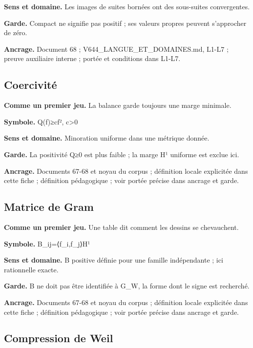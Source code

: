 \documentclass[
  9pt,
  a4paper,
]{article}
\begin{document}
\textbf{Sens et domaine.} Les images de suites bornées ont des
sous-suites convergentes.

\textbf{Garde.} Compact ne signifie pas positif ; ses valeurs propres
peuvent s'approcher de zéro.

\textbf{Ancrage.} Document 68 ; V644\_LANGUE\_ET\_DOMAINES.md, L1-L7 ;
preuve auxiliaire interne ; portée et conditions dans L1-L7.

\hypertarget{coercivituxe9}{%
\subsection{Coercivité}\label{coercivituxe9}}

\textbf{Comme un premier jeu.} La balance garde toujours une marge
minimale.

\textbf{Symbole.} Q(f)≥c\textbar\textbar f\textbar\textbar²,
c\textgreater0

\textbf{Sens et domaine.} Minoration uniforme dans une métrique donnée.

\textbf{Garde.} La positivité Q≥0 est plus faible ; la marge H¹ uniforme
est exclue ici.

\textbf{Ancrage.} Documents 67-68 et noyau du corpus ; définition locale
explicitée dans cette fiche ; définition pédagogique ; voir portée
précise dans ancrage et garde.

\hypertarget{matrice-de-gram}{%
\subsection{Matrice de Gram}\label{matrice-de-gram}}

\textbf{Comme un premier jeu.} Une table dit comment les dessins se
chevauchent.

\textbf{Symbole.} B\_ij=⟨f\_i,f\_j⟩H¹

\textbf{Sens et domaine.} B positive définie pour une famille
indépendante ; ici rationnelle exacte.

\textbf{Garde.} B ne doit pas être identifiée à G\_W, la forme dont le
signe est recherché.

\textbf{Ancrage.} Documents 67-68 et noyau du corpus ; définition locale
explicitée dans cette fiche ; définition pédagogique ; voir portée
précise dans ancrage et garde.

\hypertarget{compression-de-weil}{%
\subsection{Compression de Weil}\label{compression-de-weil}}
\end{document}
